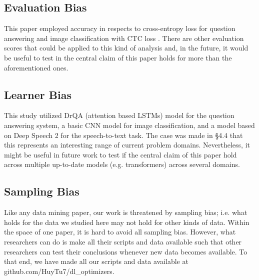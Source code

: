 \subsection{Evaluation Bias}

This paper employed accuracy in respects to cross-entropy loss for question answering and image classification with CTC loss \cite{}. There are other evaluation scores that could be applied to this kind of analysis
and, in the future, it would be useful to test in the central claim of this paper holds for more than the aforementioned ones.

\subsection{Learner Bias}

This study utilized DrQA (attention based LSTMs) model for the question answering system, a basic CNN model for image classification, and a model based on Deep Speech 2 for the speech-to-text task. The case was made in \S4.4 that this represents an interesting range of current problem domains. Nevertheless, it might be useful in future work to test if the central claim of this paper hold across multiple up-to-date models (e.g. transformers) across several domains.

\subsection{Sampling Bias}

Like any data mining paper, our work is threatened by sampling bias; i.e. what holds for the data we studied here may not hold for other kinds of data.  Within the space of one paper, it is hard to avoid all sampling bias. However, what researchers can do is make all their scripts and data available such that other researchers can test their conclusions whenever new data becomes available. To that end, we have made all our scripts and data available at github.com/HuyTu7/dl\_optimizers.